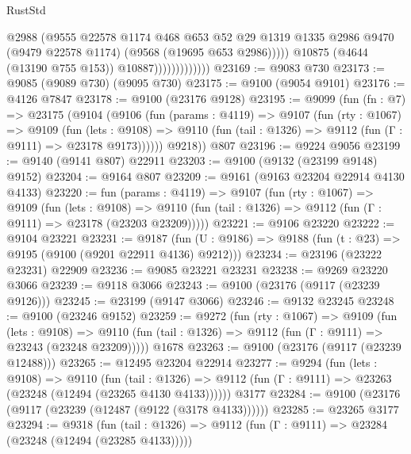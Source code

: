 \begin{lexlean}{RustStd}
\begin{coremodule}
                                  @2988
                                  (@9555
                                    @22578
                                    @1174
                                    @468
                                    @653
                                    @52
                                    @29
                                    @1319
                                    @1335
                                    @2986
                                    @9470
                                    (@9479 @22578 @1174)
                                    (@9568 (@19695 @653 @2986)))))
                              @10875
                              (@4644 (@13190 @755 @153))
                              @10887)))))))))))))
@23169 := @9083 @730
@23173 := @9085 (@9089 @730) (@9095 @730)
@23175 := @9100 (@9054 @9101)
@23176 := @4126 @7847
@23178 := @9100 (@23176 @9128)
@23195 := @9099
    (fun (fn : @7) =>
    @23175
      (@9104
        (@9106
          (fun (params : @4119) =>
          @9107
            (fun (rty : @1067) =>
            @9109
              (fun (lets : @9108) =>
              @9110 (fun (tail : @1326) => @9112 (fun (Γ : @9111) => @23178 @9173))))))
        @9218))
    @807
@23196 := @9224 @9056
@23199 := @9140 (@9141 @807) @22911
@23203 := @9100 (@9132 (@23199 @9148) @9152)
@23204 := @9164 @807
@23209 := @9161 (@9163 @23204 @22914 @4130 @4133)
@23220 := fun (params : @4119) =>
  @9107
    (fun (rty : @1067) =>
    @9109
      (fun (lets : @9108) =>
      @9110 (fun (tail : @1326) => @9112 (fun (Γ : @9111) => @23178 (@23203 @23209)))))
@23221 := @9106 @23220
@23222 := @9104 @23221
@23231 := @9187
    (fun (U : @9186) => @9188 (fun (t : @23) => @9195 (@9100 (@9201 @22911 @4136) @9212)))
@23234 := @23196 (@23222 @23231) @22909
@23236 := @9085 @23221 @23231
@23238 := @9269 @23220 @3066
@23239 := @9118 @3066
@23243 := @9100 (@23176 (@9117 (@23239 @9126)))
@23245 := @23199 (@9147 @3066)
@23246 := @9132 @23245
@23248 := @9100 (@23246 @9152)
@23259 := @9272
    (fun (rty : @1067) =>
    @9109
      (fun (lets : @9108) =>
      @9110 (fun (tail : @1326) => @9112 (fun (Γ : @9111) => @23243 (@23248 @23209)))))
    @1678
@23263 := @9100 (@23176 (@9117 (@23239 @12488)))
@23265 := @12495 @23204 @22914
@23277 := @9294
    (fun (lets : @9108) =>
    @9110
      (fun (tail : @1326) =>
      @9112 (fun (Γ : @9111) => @23263 (@23248 (@12494 (@23265 @4130 @4133))))))
    @3177
@23284 := @9100 (@23176 (@9117 (@23239 (@12487 (@9122 (@3178 @4133))))))
@23285 := @23265 @3177
@23294 := @9318
    (fun (tail : @1326) => @9112 (fun (Γ : @9111) => @23284 (@23248 (@12494 (@23285 @4133)))))

\end{coremodule}
\end{lexlean}
